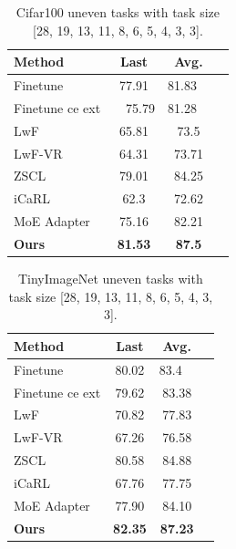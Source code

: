 \documentclass{article}
\theoremstyle{definition}
\theoremstyle{remark}
\begin{document}
\begin{table}[H]
\centering
\scriptsize
\setlength{\tabcolsep}{10pt}

\label{tab:cifar100_uneven_method_ieee}
\begin{tabular}{lccc}
\toprule
Method & Last & Avg.\\
\midrule
Finetune& 77.91 & 81.83  \\
Finetune ce ext&  75.79 & 81.28  \\
LwF& 65.81 & 73.5 \\
LwF-VR& 64.31 & 73.71\\
ZSCL& 79.01 & 84.25 \\
iCaRL& 62.3 & 72.62 \\
MoE Adapter& 75.16 & 82.21\\
\textbf{Ours} & \textbf{81.53} & \textbf{87.5}\\
\bottomrule
\end{tabular}
\vspace{1mm}

\caption{Cifar100 uneven tasks with task size [28, 19, 13, 11, 8, 6, 5, 4, 3, 3].
}
\footnotesize

\end{table}


\begin{table}[H]
\centering
\scriptsize
\setlength{\tabcolsep}{10pt}

\label{tab:Tinyimagenet_uneven_method_ieee}
\begin{tabular}{lccc}
\toprule
Method & Last & Avg.\\
\midrule
Finetune& 80.02 & 83.4  \\
Finetune ce ext& 79.62 & 83.38 \\
LwF& 70.82 & 77.83\\
LwF-VR& 67.26 & 76.58 \\
ZSCL& 80.58 & 84.88 \\
iCaRL& 67.76 & 77.75\\
MoE Adapter& 77.90 & 84.10 \\
\textbf{Ours} & \textbf{82.35} & \textbf{87.23}\\
\bottomrule
\end{tabular}
\vspace{1mm}

\caption{TinyImageNet uneven tasks with task size [28, 19, 13, 11, 8, 6, 5, 4, 3, 3].
}
\footnotesize

\end{table}
\end{document}
